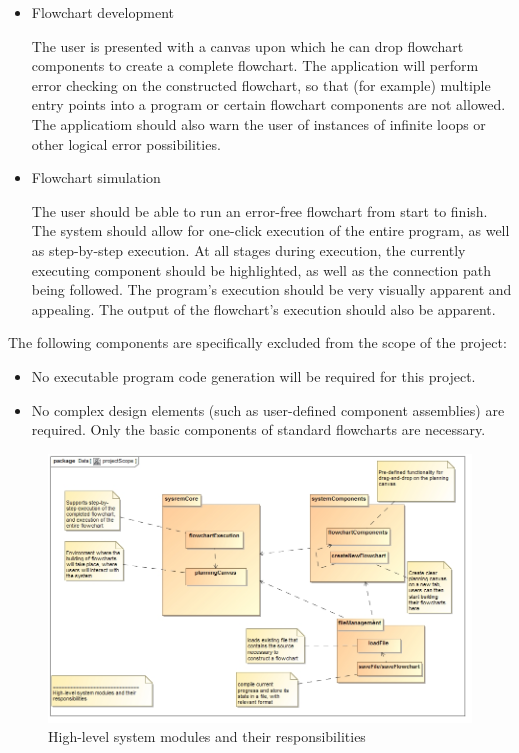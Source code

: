 \documentclass[11pt,a4paper,titlepage]{article}
\begin{document}
\begin{itemize}
\item Flowchart development

The user is presented with a canvas upon which he can drop flowchart components to create a  complete flowchart.
The application will perform error checking on the constructed flowchart, so that (for example) multiple entry points into a program or certain flowchart components are not allowed. The applicatiom should also warn the user of instances of infinite loops or other  logical error possibilities. 

\item Flowchart simulation

The user should be able to run an error-free flowchart from start to finish. The system should allow for one-click execution of the entire program, as well as step-by-step execution. At all stages during execution, the currently executing component should be
highlighted, as well as the connection path being followed. The program's execution should
be very visually apparent and appealing. The output of the flowchart's execution should also
be apparent. 
\end{itemize}

The following components are specifically excluded from the scope of the project:

\begin{itemize}
\item No executable program code generation will be required for this project.
\item No complex design elements (such as user-defined component assemblies) are required.
Only the basic components of standard flowcharts are necessary.\\

\end{itemize}

\begin{figure}[H]
  \centering
\includegraphics[width=500px]{projectScope.jpg}
\caption{High-level system modules and their responsibilities}
\end{figure}
\end{document}
